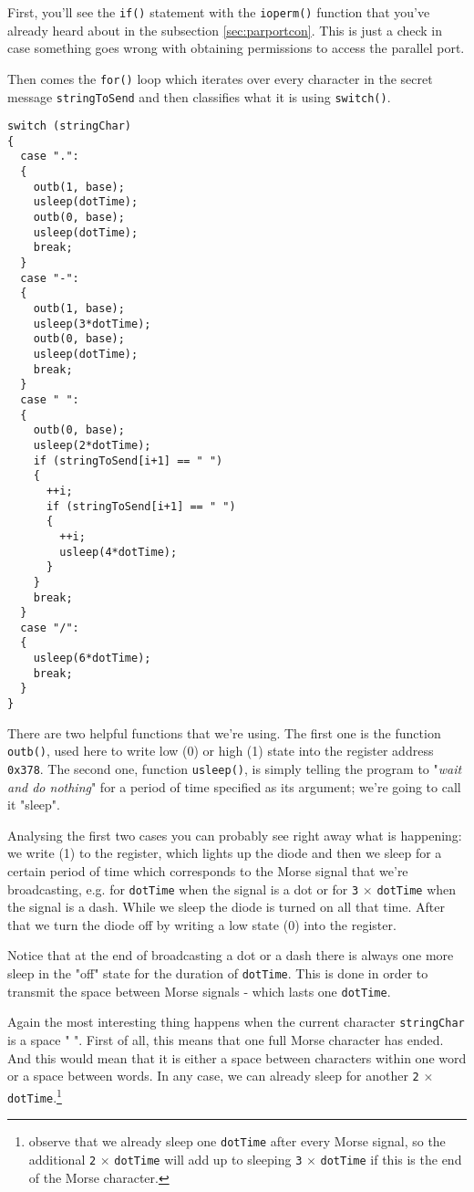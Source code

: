 \documentclass[12pt]{report}
\begin{document}
First, you'll see the \texttt{if()} statement with the \texttt{ioperm()} function that you've already heard about in the subsection \ref{sec:parportcon}. This is just a check in case something goes wrong with obtaining permissions to access the parallel port.

Then comes the \texttt{for()} loop which iterates over every character in the secret message \texttt{stringToSend} and then classifies what it is using \texttt{switch()}.

\newpage

\begin{lstlisting}
switch (stringChar)
{
  case ".":
  {
    outb(1, base);
    usleep(dotTime);
    outb(0, base);
    usleep(dotTime);
    break;
  }
  case "-":
  {
    outb(1, base);
    usleep(3*dotTime);
    outb(0, base);
    usleep(dotTime);
    break;
  }
  case " ":
  {
    outb(0, base);
    usleep(2*dotTime);
    if (stringToSend[i+1] == " ")
    {
      ++i;
      if (stringToSend[i+1] == " ")
      {
        ++i;
        usleep(4*dotTime);
      }
    }
    break;
  }
  case "/":
  {
    usleep(6*dotTime);
    break;
  }
}
\end{lstlisting}

There are two helpful functions that we're using. The first one is the function \texttt{outb()}, used here to write low (0) or high (1) state into the register address \texttt{0x378}. The second one, function \texttt{usleep()}, is simply telling the program to "\textit{wait and do nothing}" for a period of time specified as its argument; we're going to call it "sleep".

Analysing the first two cases you can probably see right away what is happening: we write (1) to the register, which lights up the diode and then we sleep for a certain period of time which corresponds to the Morse signal that we're broadcasting, e.g. for \verb|dotTime| when the signal is a dot or for \verb|3| $\times$ \verb|dotTime| when the signal is a dash. While we sleep the diode is turned on all that time. After that we turn the diode off by writing a low state (0) into the register.

Notice that at the end of broadcasting a dot or a dash there is always one more sleep in the "off" state for the duration of \verb|dotTime|. This is done in order to transmit the space between Morse signals - which lasts one \verb|dotTime|.

Again the most interesting thing happens when the current character \texttt{stringChar} is a space " ". First of all, this means that one full Morse character has ended. And this would mean that it is either a space between characters within one word or a space between words. In any case, we can already sleep for another \verb|2| $\times$ \verb|dotTime|.\footnote{observe that we already sleep one \texttt{dotTime} after every Morse signal, so the additional \texttt{2} $\times$ \texttt{dotTime} will add up to sleeping \texttt{3} $\times$ \texttt{dotTime} if this is the end of the Morse character.} 
\end{document}
